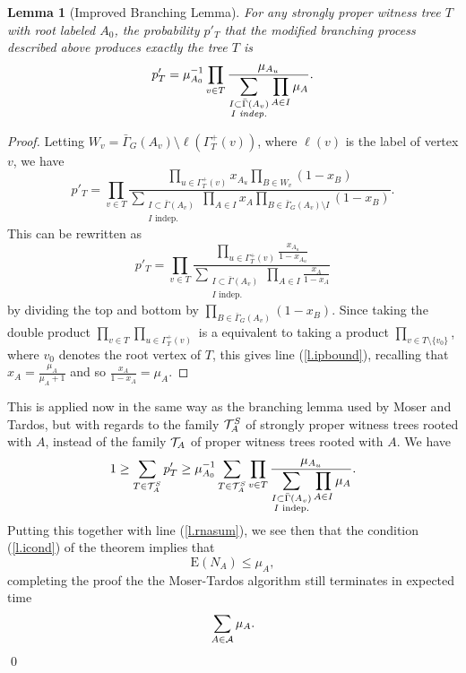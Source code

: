 \documentclass[letterpaper]{article}
\newcommand{\e}{\textrm{E}}
\newcommand{\aaa}{{\cal A}}
\newcommand{\ttt}{{\cal T}}
\newcommand{\sbs}{\subset}
\newcommand{\bfrac}[2]{\frac{\displaystyle #1}{\displaystyle #2}}
\newtheorem{lemma}[theorem]{Lemma}
\theoremstyle{definition}
\theoremstyle{remark}
\newcommand{\stm}{\setminus}
\begin{document}
\begin{lemma}[Improved Branching Lemma]
  For any strongly proper witness tree $T$ with root labeled $A_0$, the probability $p'_T$ that the modified branching process described above produces exactly the tree $T$ is
\begin{equation}
p'_T=\mu_{A_0}^{-1}
\prod_{v\in T}\bfrac{\mu_{A_u}}{\sum_{\substack{I\sbs \bar\Gamma(A_v)\\ I \textrm{ \emph{indep.}}}} \prod_{A\in I}\mu_A}.
\label{l.ipbound}
\end{equation}
\end{lemma}
\begin{proof}
Letting $W_v=\bar\Gamma_G(A_v)\stm \ell(\Gamma^+_T(v))$, where $\ell(v)$ is the label of vertex $v$, we have
\[
p'_T=\prod_{v\in T}
\bfrac{
 \prod_{u\in \Gamma^+_T(v)}x_{A_u} \prod_{B\in W_v}(1-x_B)
}
{
\sum_{\substack{I\sbs \bar\Gamma(A_v)\\ I \textrm{ indep.}}} \prod_{A\in I}x_A\prod_{B\in \bar\Gamma_G(A_v)\stm I}(1-x_B)
}.
\]
This can be rewritten as
\[
p'_T=\prod_{v\in T}
\bfrac{
\prod_{u\in \Gamma^+_T(v)}\frac{x_{A_u}}{1-x_{A_u}}
}
{
\sum_{\substack{I\sbs \bar\Gamma(A_v)\\ I \textrm{ indep.}}} \prod_{A\in I}\frac{x_A}{1-x_A}
}
\]
by dividing the top and bottom by $\prod_{B\in \bar\Gamma_G(A_v)}(1-x_B)$.  Since taking the double product $\prod_{v\in T} \prod_{u\in \Gamma^+_T(v)}$ is a equivalent to taking a product $\prod_{v\in T\stm \{v_0\}}$, where $v_0$ denotes the root vertex of $T$, this gives line (\ref{l.ipbound}), recalling that $x_A=\frac{\mu_A}{\mu_A+1}$ and so $\frac{x_A}{1-x_A}=\mu_A$.
\end{proof}
This is applied now in the same way as the branching lemma used by Moser and Tardos, but with regards to the family $\ttt^S_A$ of strongly proper witness trees rooted with $A$, instead of the family $\ttt_A$ of proper witness trees rooted with $A$.
We have
\begin{equation}
1\geq \sum_{T\in \ttt^S_A}p'_T\geq 
\mu_{A_0}^{-1}\sum_{T\in \ttt^S_A}
\prod_{v\in T}\bfrac{\mu_{A_u}}{\sum_{\substack{I\sbs \bar\Gamma(A_v)\\ I \textrm{ indep.}}} \prod_{A\in I}\mu_A}.
\label{}
\end{equation}
Putting this together with line (\ref{l.rnasum}), we see then that the condition (\ref{l.icond}) of the theorem implies that
\begin{equation}
  \e(N_A)\leq \mu_A,
\end{equation}
completing the proof the the Moser-Tardos algorithm still terminates in expected time
\[
\sum_{A\in \aaa} \mu_A.
\]\qed
\end{document}
